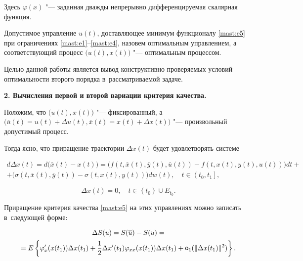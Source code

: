 Здесь $ \varphi (x) $  "--- заданная дважды непрерывно дифференцируемая скалярная функция.



Допустимое управление $ u(t) $,  доставляющее минимум функционалу \eqref{mast:e5}  при ограничениях \eqref{mast:e1}--\eqref{mast:e4}, назовем оптимальным управлением, а соответствующий процесс $ \bigl(u(t), x(t)\bigr) $  "--- оптимальным процессом.



Целью данной работы является вывод  конструктивно проверяемых условий оптимальности второго порядка в~рассматриваемой задаче.



\smallskip



\textbf{2. Вычисления первой и второй вариации критерия качества.} 

Положим, что $ \bigl(u(t), x(t)\bigr) $ "--- фиксированный, а $ \bigl(\overline{u}(t)=u(t)+\Delta u(t), \overline{x}(t)=x(t)+\Delta x(t) \bigr) $   "--- произвольный допустимый процесс. 

Тогда ясно, что приращение траектории  $ \Delta x(t)  $ будет  удовлетворять системе

\begin{multline}

\label{mast:e6}

d\Delta x(t)=d \bigl( \overline{x}(t)-x(t) \bigr)   =\bigl( f(t, \overline{x}(t), \overline{y}(t), \overline{u}(t))-f(t, x(t), y(t), u(t))\bigr) dt+ \\

+\bigl( \sigma(t, \overline{x}(t), \overline{y}(t))-\sigma(t, x(t), y(t))\bigr) d w(t), \quad t\in \left( t_{0}, t_{1} \right] ,

\end{multline}

\begin{equation}

\label{mast:e7}

\Delta x(t)=0, \quad t\in \left\lbrace  t_{0} \right\rbrace \cup E_{t_{0}} .

\end{equation}



Приращение критерия качества \eqref{mast:e5}  на этих управлениях можно записать в~следующей форме:

\begin{multline}

\Delta S(u)=S(\overline{u})-S(u)=

\\ =E \left\lbrace \varphi'_{x}(x(t_{1})) \Delta x(t_{1})+\frac{1}{2} \Delta x'(t_{1}) \varphi_{xx}(x(t_{1}))\Delta x(t_{1})+\mathop{\sf o}\nolimits_{1}(\| \Delta x(t_{1}) \|^{2})  \right\rbrace. 

\label{mast:e8}

\end{multline}




